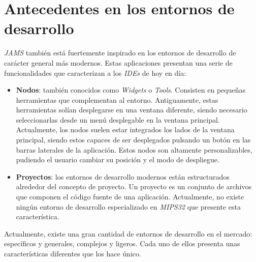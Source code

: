 \section{Antecedentes en los entornos de desarrollo}
\label{sec:antecedentes-en-los-entornos-de-desarrollo}

\noindent \textit{JAMS} también está fuertemente inspirado en los
entornos de desarrollo de carácter general más modernos.
Estas aplicaciones presentan una serie de funcionalidades que
caracterizan a los \textit{IDEs} de hoy en día:

\begin{itemize}
    \item \textbf{Nodos}: también conocidos como \textit{Widgets} o \textit{Tools}.
    Consisten en pequeñas herramientas que complementan al entorno.
    Antiguamente, estas herramientas solían desplegarse en una ventana diferente,
    siendo necesario seleccionarlas desde un menú desplegable en la ventana principal.
    Actualmente, los nodos suelen estar integrados los lados de la ventana principal,
    siendo estos capaces de ser desplegados pulsando un botón en las barras laterales
    de la aplicación.
    Estos nodos son altamente personalizables, pudiendo el usuario cambiar su posición
    y el modo de despliegue.
    \item \textbf{Proyectos}: los entornos de desarrollo modernos están estructurados
    alrededor del concepto de proyecto.
    Un proyecto es un conjunto de archivos que componen el código fuente de una aplicación.
    Actualmente, no existe ningún entorno de desarrollo especializado en \textit{MIPS32}
    que presente esta característica.
\end{itemize}

Actualmente, existe una gran cantidad de entornos de desarrollo en el mercado:
específicos y generales, complejos y ligeros.
Cada uno de ellos presenta unas características diferentes que los hace único.

